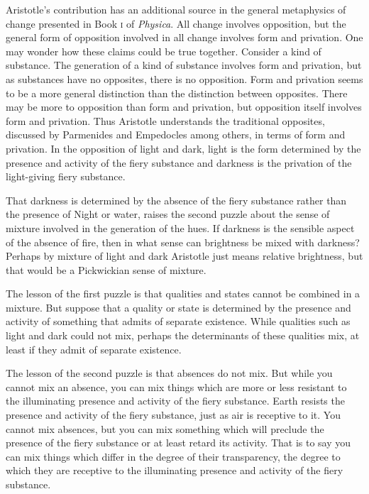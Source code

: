 Aristotle's contribution has an additional source in the general metaphysics of change presented in Book \textsc{i} of \emph{Physica}. All change involves opposition, but the general form of opposition involved in all change involves form and privation. One may wonder how these claims could be true together. Consider a kind of substance. The generation of a kind of substance involves form and privation, but as substances have no opposites, there is no opposition. Form and privation seems to be a more general distinction than the distinction between opposites. There may be more to opposition than form and privation, but opposition itself involves form and privation. Thus Aristotle understands the traditional opposites, discussed by Parmenides and Empedocles among others, in terms of form and privation. In the opposition of light and dark, light is the form determined by the presence and activity of the fiery substance and darkness is the privation of the light-giving fiery substance. 

That darkness is determined by the absence of the fiery substance rather than the presence of Night or water, raises the second puzzle about the sense of mixture involved in the generation of the hues. If darkness is the sensible aspect of the absence of fire, then in what sense can brightness be mixed with darkness? Perhaps by mixture of light and dark Aristotle just means relative brightness, but that would be a Pickwickian sense of mixture. 

The lesson of the first puzzle is that qualities and states cannot be combined in a mixture. But suppose that a quality or state is determined by the presence and activity of something that admits of separate existence. While qualities such as light and dark could not mix, perhaps the determinants of these qualities mix, at least if they admit of separate existence.

The lesson of the second puzzle is that absences do not mix. But while you cannot mix an absence, you can mix things which are more or less resistant to the illuminating presence and activity of the fiery substance. Earth resists the presence and activity of the fiery substance, just as air is receptive to it. You cannot mix absences, but you can mix something which will preclude the presence of the fiery substance or at least retard its activity. That is to say you can mix things which differ in the degree of their transparency, the degree to which they are receptive to the illuminating presence and activity of the fiery substance.

